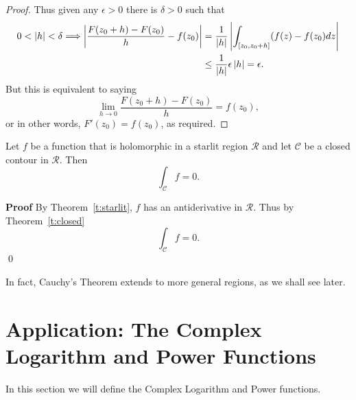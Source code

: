 \begin{proof}
Thus given any $\epsilon>0$ there is $\delta>0$ such that
\begin{align*}
0 < \left| h \right| < \delta \Longrightarrow 
\left|  \frac{F(z_0+h)-F(z_0)}{h}-f(z_0)  \right| & = \frac{1}{\left| h \right|} \left|  \int_{[z_0,z_0+h]} (f(z)-f(z_0) dz  \right| \\
& \leq \frac{1}{\left| h \right|} \epsilon \left| h \right| = \epsilon.
\end{align*}
But this is equivalent to saying
\[
\lim_{h \to 0} \frac{F(z_0+h)-F(z_0)}{h} = f(z_0),
\]
or in other words, $F'(z_0)=f(z_0)$, as required.

\end{proof}
\begin{theorem}
\label{t:cauchyst}
Let $f$ be a function that is holomorphic in a starlit region $\mathcal{R}$ and let $\mathcal{C}$ be a closed contour in $\mathcal{R}$.  Then
\[
\int_{\mathcal{C}} f = 0.
\]
\end{theorem}
\begin{blankbox}
{\bf Proof}
By Theorem~\ref{t:starlit}, $f$ has an antiderivative in $\mathcal{R}$.  Thus by Theorem~\ref{t:closed}
\[
\int_{\mathcal{C}} f = 0.
\]
\qed
\end{blankbox}

In fact, Cauchy's Theorem extends to more general regions, as we shall see later.

\section{Application: The Complex Logarithm and Power Functions}

In this section we will define the Complex Logarithm and Power functions.


